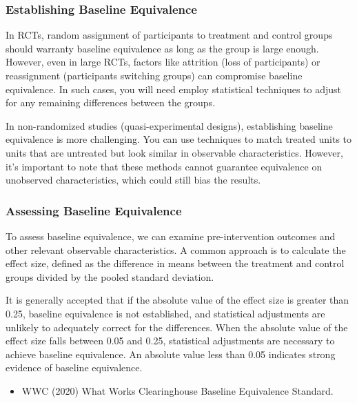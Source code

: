 \documentclass[
  letterpaper,
  DIV=11,
  numbers=noendperiod]{scrreprt}
\providecommand{\tightlist}{%
  \setlength{\itemsep}{0pt}\setlength{\parskip}{0pt}}\usepackage{longtable,booktabs,array}
\begin{document}
\subsubsection{Establishing Baseline
Equivalence}\label{establishing-baseline-equivalence}

In RCTs, random assignment of participants to treatment and control
groups should warranty baseline equivalence as long as the group is
large enough. However, even in large RCTs, factors like attrition (loss
of participants) or reassignment (participants switching groups) can
compromise baseline equivalence. In such cases, you will need employ
statistical techniques to adjust for any remaining differences between
the groups.

In non-randomized studies (quasi-experimental designs), establishing
baseline equivalence is more challenging. You can use techniques to
match treated units to units that are untreated but look similar in
observable characteristics. However, it's important to note that these
methods cannot guarantee equivalence on unobserved characteristics,
which could still bias the results.

\subsubsection{Assessing Baseline
Equivalence}\label{assessing-baseline-equivalence}

To assess baseline equivalence, we can examine pre-intervention outcomes
and other relevant observable characteristics. A common approach is to
calculate the effect size, defined as the difference in means between
the treatment and control groups divided by the pooled standard
deviation.

It is generally accepted that if the absolute value of the effect size
is greater than 0.25, baseline equivalence is not established, and
statistical adjustments are unlikely to adequately correct for the
differences. When the absolute value of the effect size falls between
0.05 and 0.25, statistical adjustments are necessary to achieve baseline
equivalence. An absolute value less than 0.05 indicates strong evidence
of baseline equivalence.

\begin{tcolorbox}[enhanced jigsaw, colframe=quarto-callout-tip-color-frame, left=2mm, toprule=.15mm, colbacktitle=quarto-callout-tip-color!10!white, title=\textcolor{quarto-callout-tip-color}{\faLightbulb}\hspace{0.5em}{Learn more}, coltitle=black, rightrule=.15mm, leftrule=.75mm, colback=white, arc=.35mm, bottomtitle=1mm, bottomrule=.15mm, breakable, titlerule=0mm, opacitybacktitle=0.6, toptitle=1mm, opacityback=0]

\begin{itemize}
\tightlist
\item
  WWC (2020) What Works Clearinghouse Baseline Equivalence Standard.
\end{itemize}

\end{tcolorbox}
\end{document}
